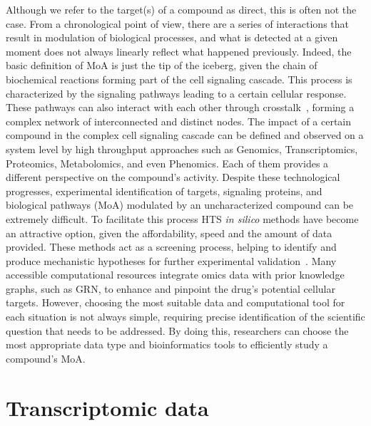 Although we refer to the target(s) of a compound as direct, this is often not the case. 
From a chronological point of view, there are a series of interactions that result in modulation of biological processes, and what is detected at a given moment does not always linearly reflect what happened previously. 
Indeed, the basic definition of \gls{MoA} is just the tip of the iceberg, given the chain of biochemical reactions forming part of the cell signaling cascade. 
This process is characterized by the signaling pathways leading to a certain cellular response. These pathways can also interact with each other through crosstalk~\cite{RN94}, forming a complex network of interconnected and distinct nodes. 
The impact of a certain compound in the complex cell signaling cascade can be defined and observed on a system level by high throughput approaches such as Genomics, \gls{Transcriptomics}, Proteomics, Metabolomics, and even Phenomics. 
Each of them provides a different perspective on the compound's activity. 
Despite these technological progresses, experimental identification of targets, signaling proteins, and biological pathways (\gls{MoA}) modulated by an uncharacterized compound can be extremely difficult. 
To facilitate this process \gls{HTS} \textit{in silico} methods have become an attractive option, given the affordability, speed and the amount of data provided. 
These methods act as a screening process, helping to identify and produce mechanistic hypotheses for further experimental validation~\cite{RN38}. 
Many accessible computational resources integrate omics data with prior knowledge graphs, such as \gls{GRN}, to enhance and pinpoint the drug's potential cellular targets. 
However, choosing the most suitable data and computational tool for each situation is not always simple, requiring precise identification of the scientific question that needs to be addressed. 
By doing this, researchers can choose the most appropriate data type and bioinformatics tools to efficiently study a compound's \gls{MoA}.

\section{Transcriptomic data}
\label{sec:Transcriptomicdata}


